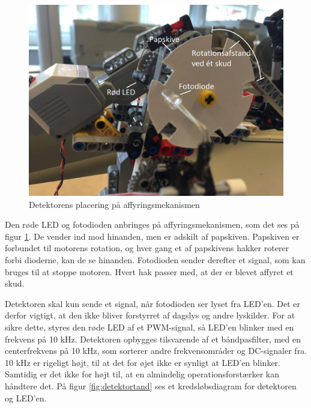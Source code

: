 \begin{figure}[H]
	\centering
	\includegraphics[width=\textwidth]{Afsnit/DesignOgImplementering/images/detektor}
	\caption{Detektorens placering på affyringsmekanismen}
	\label{fig:detektor}
\end{figure}

\noindent Den røde LED og fotodioden anbringes på affyringsmekanismen, som det ses på figur \ref{fig:detektor}. De vender ind mod hinanden, men er adskilt af papskiven. Papskiven er forbundet til motorens rotation, og hver gang et af papskivens hakker roterer forbi dioderne, kan de se hinanden. Fotodioden sender derefter et signal, som kan bruges til at stoppe motoren. Hvert hak passer med, at der er blevet affyret et skud. \newline 

\noindent Detektoren skal kun sende et signal, når fotodioden ser lyset fra LED'en. Det er derfor vigtigt, at den ikke bliver forstyrret af dagslys og andre lyskilder. For at sikre dette, styres den røde LED af et PWM-signal, så LED'en blinker med en frekvens på 10 kHz. Detektoren opbygges tilsvarende af et båndpasfilter, med en centerfrekvens på 10 kHz, som sorterer andre frekvensområder og DC-signaler fra. 10 kHz er rigeligt højt, til at det for øjet ikke er synligt at LED'en blinker. Samtidig er det ikke for højt til, at en almindelig operationsforstærker kan håndtere det. På figur \ref*{fig:detektortand} ses et kredsløbsdiagram for detektoren og LED'en. \newline

